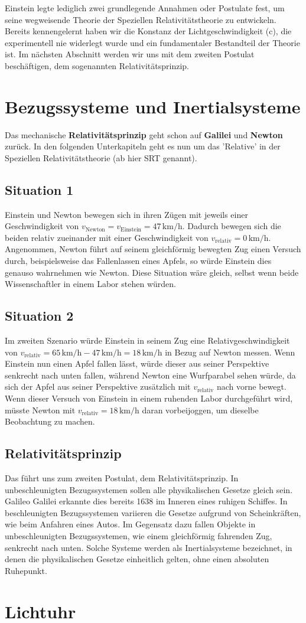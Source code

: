 \documentclass{report}
\begin{document}
Einstein legte lediglich zwei grundlegende Annahmen oder Postulate fest, um seine wegweisende Theorie der Speziellen Relativitätstheorie zu entwickeln. Bereits kennengelernt haben wir die Konstanz der Lichtgeschwindigkeit (c), die experimentell nie widerlegt wurde und ein fundamentaler Bestandteil der Theorie ist. 
Im nächsten Abschnitt werden wir uns mit dem zweiten Postulat beschäftigen, dem sogenannten Relativitätsprinzip.
\section{Bezugssysteme und Inertialsysteme}
Das mechanische \textbf{Relativitätsprinzip} geht schon auf \textbf{Galilei} und \textbf{Newton} zurück. In den folgenden Unterkapiteln geht es nun um das 'Relative' in der Speziellen Relativitätstheorie (ab hier SRT genannt).
\subsection{Situation 1}
Einstein und Newton bewegen sich in ihren Zügen mit jeweils einer Geschwindigkeit von \(v_{\text{Newton}} = v_{\text{Einstein}} = 47 \, \text{km/h}\). Dadurch bewegen sich die beiden relativ zueinander mit einer Geschwindigkeit von \(v_{\text{relativ}} = 0 \, \text{km/h}\).
Angenommen, Newton führt auf seinem gleichförmig bewegten Zug einen Versuch durch, beispielsweise das Fallenlassen eines Apfels, so würde Einstein dies genauso wahrnehmen wie Newton. Diese Situation wäre gleich, selbst wenn beide Wissenschaftler in einem Labor stehen würden.
\subsection{Situation 2}
Im zweiten Szenario würde Einstein in seinem Zug eine Relativgeschwindigkeit von \(v_{\text{relativ}} = 65 \, \text{km/h} - 47 \, \text{km/h} = 18 \, \text{km/h}\) in Bezug auf Newton messen. Wenn Einstein nun einen Apfel fallen lässt, würde dieser aus seiner Perspektive senkrecht nach unten fallen, während Newton eine Wurfparabel sehen würde, da sich der Apfel aus seiner Perspektive zusätzlich mit \(v_{\text{relativ}}\) nach vorne bewegt.
Wenn dieser Versuch von Einstein in einem ruhenden Labor durchgeführt wird, müsste Newton mit \(v_{\text{relativ}} = 18 \, \text{km/h}\) daran vorbeijoggen, um dieselbe Beobachtung zu machen.
\subsection{Relativitätsprinzip}
Das führt uns zum zweiten Postulat, dem Relativitätsprinzip. In unbeschleunigten Bezugssystemen sollen alle physikalischen Gesetze gleich sein. Galileo Galilei erkannte dies bereits 1638 im Inneren eines ruhigen Schiffes.
In beschleunigten Bezugssystemen variieren die Gesetze aufgrund von Scheinkräften, wie beim Anfahren eines Autos. Im Gegensatz dazu fallen Objekte in unbeschleunigten Bezugssystemen, wie einem gleichförmig fahrenden Zug, senkrecht nach unten. Solche Systeme werden als Inertialsysteme bezeichnet, in denen die physikalischen Gesetze einheitlich gelten, ohne einen absoluten Ruhepunkt.
\section{Lichtuhr}
\end{document}
